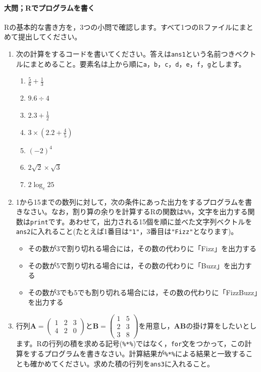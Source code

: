\documentclass{ltjsbook}
\begin{document}
\paragraph{大問；Rでプログラムを書く}
Rの基本的な書き方を，3つの小問で確認します。すべて1つのRファイルにまとめて提出してください。
\begin{enumerate}
	\item 次の計算をするコードを書いてください。答えは\verb|ans1|という名前つきベクトルにまとめること。要素名は上から順に\verb|a|，\verb|b|，\verb|c|，\verb|d|，\verb|e|，\verb|f|，\verb|g|とします。
	      \begin{enumerate}
		      \item $\frac{5}{6} + \frac{1}{3}$
		      \item $9.6 \div 4$
		      \item $2.3 + \frac{1}{2}$
		      \item $3\times (2.2 + \frac{4}{5})$
		      \item $(-2)^4$
		      \item $2\sqrt{2} \times \sqrt{3}$
		      \item $2\log_e 25$
	      \end{enumerate}
	\item 1から15までの数列に対して，次の条件にあった出力をするプログラムを書きなさい。なお，割り算の余りを計算するRの関数は\verb|%%|，文字を出力する関数は\verb|print|です。あわせて，出力される15個を順に並べた文字列ベクトルを\verb|ans2|に入れること(たとえば1番目は\verb|"1"|，3番目は\verb|"Fizz"|となります)。
	      \begin{itemize}
		      \item その数が3で割り切れる場合には，その数の代わりに「Fizz」を出力する
		      \item その数が5で割り切れる場合には，その数の代わりに「Buzz」を出力する
		      \item その数が3でも5でも割り切れる場合には，その数の代わりに「FizzBuzz」を出力する
	      \end{itemize}
	\item 行列$\bm{A} = \begin{pmatrix}1&2&3\\4&2&0\end{pmatrix}$と$\bm{B}=\begin{pmatrix}1&5\\2&3\\3&8\end{pmatrix}$を用意し，$\bm{AB}$の掛け算をしたいとします。Rの行列の積を求める記号(\verb|%*%|)ではなく，\verb|for|文をつかって，この計算をするプログラムを書きなさい。計算結果が\verb|%*%|による結果と一致することも確かめてください。求めた積の行列を\verb|ans3|に入れること。
\end{enumerate}
\end{document}
